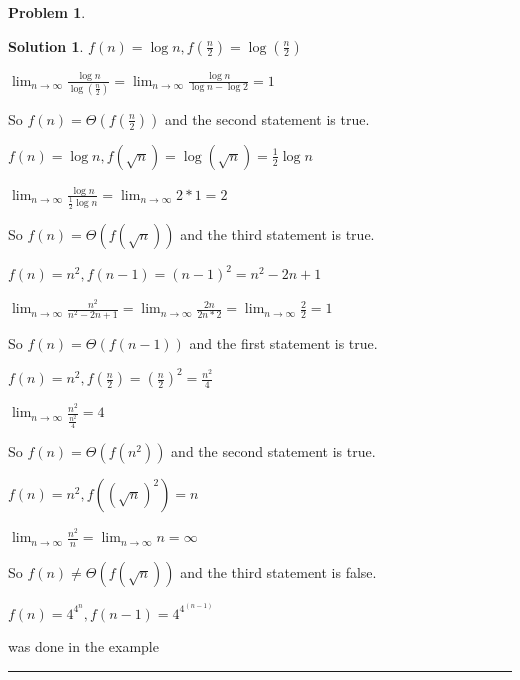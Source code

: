 \documentclass{article}
\theoremstyle{definition}
\newtheorem{problem}{Problem}
\def\fline{\rule{0.75\linewidth}{0.5pt}}
\newcommand{\finishline}{\begin{center}\fline\end{center}}
\newtheorem*{solution*}{Solution}
\newenvironment{solution}{\begin{solution*}}{{\finishline} \end{solution*}}
\begin{document}
\begin{problem}
\begin{solution}
	\item $f(n) = \log n, f(\frac{n}{2}) = \log (\frac{n}{2})$
	\begin{center}
		\item $\lim_{n \to \infty}\frac{\log n}{\log (\frac{n}{2})} = \lim_{n \to \infty}\frac{\log n}{\log n - \log 2} = 1$ 
		\item So $f(n) = \Theta(f(\frac{n}{2}))$ and the second statement is true.
	\end{center}

	\item $f(n) = \log n, f(\sqrt n) = \log (\sqrt n) = \frac{1}{2}\log n$
	\begin{center}
		\item $\lim_{n \to \infty}\frac{\log n}{\frac{1}{2}\log n} = \lim_{n \to \infty}{2 * 1} = 2$ 
		\item So $f(n) = \Theta(f(\sqrt n))$ and the third statement is true.
	\end{center}

	\item $f(n) = n^2, f(n-1) = (n-1)^2 = n^2 - 2n + 1$ 
	\begin{center} 
		\item $\lim_{n \to \infty}\frac{n^2}{n^2 - 2n + 1} = \lim_{n \to \infty}\frac{2n}{2n * 2} = \lim_{n \to \infty}\frac{2}{2} = 1$ 
		\item So $f(n) = \Theta(f(n-1))$ and the first statement is true.
	\end{center}
	
	\item $f(n) = n^2, f(\frac{n}{2}) = (\frac{n}{2})^2 = \frac{n^2}{4}$
	\begin{center} 
		\item $\lim_{n \to \infty}\frac{n^2}{\frac{n^2}{4}} = 4$ 
		\item So $f(n) = \Theta(f(n^2))$ and the second statement is true.
	\end{center}

	\item $f(n) = n^2, f((\sqrt n)^2) =n$
	\begin{center} 
		\item $\lim_{n \to \infty}\frac{n^2}{n} = \lim_{n \to \infty}n = \infty$ 
		\item So $f(n) \neq \Theta(f(\sqrt n))$ and the third statement is false.
	\end{center}

	\item $f(n) = 4^{4^n}, f(n-1) = 4^{4^{(n-1)}} $
	\begin{center}
		\item was done in the example
	\end{center} 


\end{solution}
\end{problem}
\end{document}
